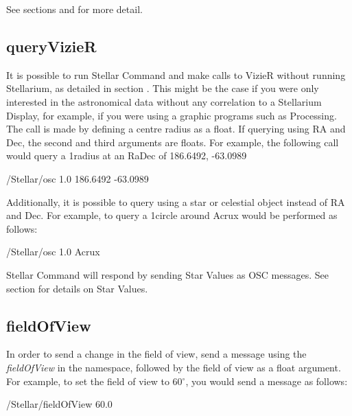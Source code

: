 See sections  and for more detail.

\subsection{queryVizieR}\label{subsec:queryVizieR}  
It is possible to run Stellar Command and make calls to  VizieR without running Stellarium, as detailed in section . This might be the case if you were only interested in the astronomical data without any correlation to  a Stellarium Display, for example, if you were using a graphic programs such as Processing. The call is made by defining a centre radius as a float. If querying using RA and Dec, the second and third arguments are floats. For example, the following call would query a 1\degree  radius at an RaDec of  186.6492, -63.0989

\begin{syntax} 
	/Stellar/osc 1.0 186.6492 -63.0989  \\
\end{syntax}
\bigskip
 
 Additionally, it is possible to query using a star or celestial object instead of RA and Dec. For example, to query a 1\degree circle around Acrux would be performed as follows:
  
 \begin{syntax} 
 	/Stellar/osc 1.0 Acrux  \\
 \end{syntax}
 \bigskip

Stellar Command will respond by sending Star Values as OSC messages. See section  for details on Star Values.

\subsection{fieldOfView}\label{subsec:fieldofview}

In order to send a change in the field of view, send a message using the \textit{fieldOfView} in the namespace, followed by the field of view as a float argument. For example, to set the field of view to 60$^{\circ}$, you would send a message as follows:
 \begin{syntax}	
 	\medskip
	/Stellar/fieldOfView 60.0
	\medskip
 \end{syntax}
\bigskip

